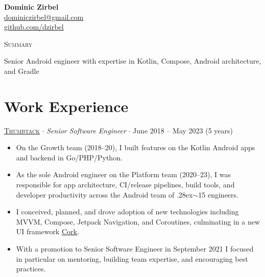 \documentclass[letterpaper,10pt]{article}
\newcommand{\nicetilde}{\raise.28ex\hbox{$\scriptstyle\sim$}}
\newcommand{\mediumlogo}{\hspace{.75mm}\raisebox{-.15\height}{}\hspace{1mm}}
\begin{document}
\thispagestyle{empty}

\begin{flushright}
    \textbf{\Large{Dominic Zirbel}} \\
    \href{mailto:dominiczirbel@gmail.com}{dominiczirbel@gmail.com} \\
    \href{https://github.com/dzirbel}{ github.com/dzirbel}
\end{flushright}

\begin{minipage}[t]{.115\linewidth}
    {\large{\textsc{Summary}}}
\end{minipage}
\begin{minipage}[t]{.875\linewidth}
    Senior Android engineer with expertise in Kotlin, Compose, Android architecture, and Gradle
\end{minipage}

\section{Work Experience}

\href{https://www.thumbtack.com/about}{\textsc{Thumbtack}} $\cdot$ \textit{Senior Software Engineer} $\cdot$ June 2018 -- May 2023 (5 years)
\begin{itemize}[itemsep=2pt, parsep=0pt, partopsep=0pt]
  \item On the Growth team (2018--20), I built features on the Kotlin Android apps and backend in Go/PHP/Python.
  \item As the sole Android engineer on the Platform team (2020--23), I was responsible for app architecture, CI/release pipelines, build tools, and developer productivity across the Android team of \nicetilde15 engineers.
  \item I conceived, planned, and drove adoption of new technologies including MVVM, Compose, Jetpack Navigation, and Coroutines, culminating in a new UI framework \href{https://medium.com/thumbtack-engineering/61a24e5e82b6}{\mediumlogo \underline{Cork}}.
  \item With a promotion to Senior Software Engineer in September 2021 I focused in particular on mentoring, building team expertise, and encouraging best practices.
\end{itemize}

\vspace{6pt}
\end{document}

